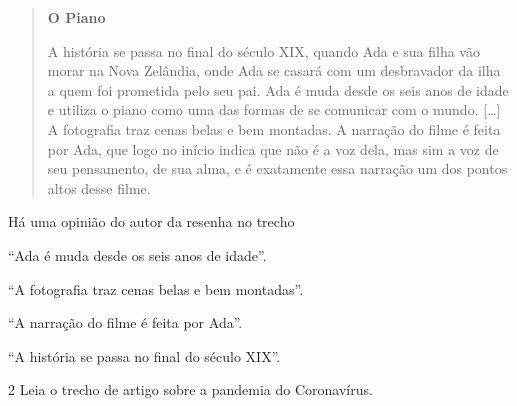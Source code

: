 \begin{quote}
\textbf{O Piano}


A história se passa no final do século XIX, quando Ada e sua filha vão
morar na Nova Zelândia, onde Ada se casará com um desbravador da ilha a
quem foi prometida pelo seu pai. Ada é muda desde os seis anos de idade
e utiliza o piano como uma das formas de se comunicar com o mundo.
{[}\ldots{}{]} A fotografia traz cenas belas e bem montadas. A narração
do filme é feita por Ada, que logo no início indica que não é a voz
dela, mas sim a voz de seu pensamento, de sua alma, e é exatamente essa
narração um dos pontos altos desse filme.

\end{quote}

Há uma opinião do autor da resenha no trecho

\begin{escolha}
\item ``Ada é muda desde os seis anos de idade''.

\item ``A fotografia traz cenas belas e bem montadas''.

\item ``A narração do filme é feita por Ada''.

\item ``A história se passa no final do século XIX''.
\end{escolha}

\num{2} Leia o trecho de artigo sobre a pandemia do Coronavírus.

